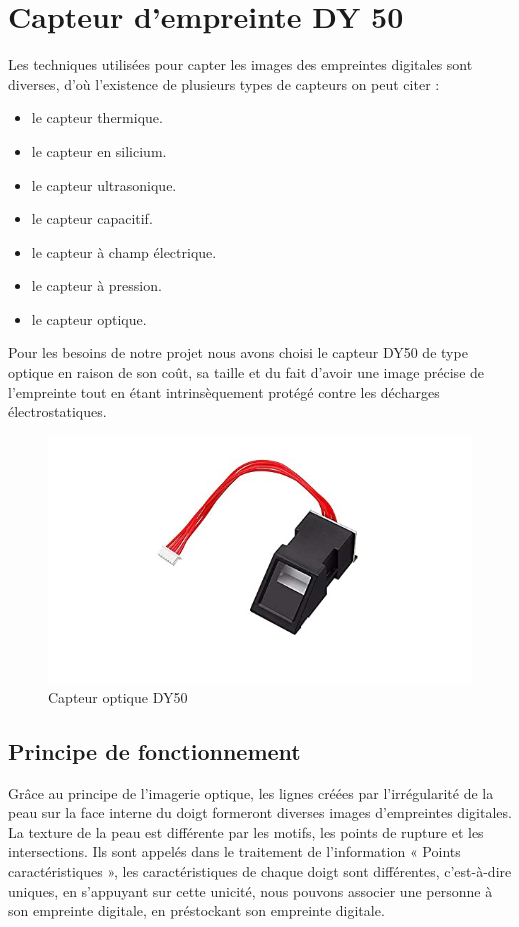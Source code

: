         
\section{Capteur d'empreinte DY 50}
Les techniques utilisées pour capter les images des empreintes digitales sont 
diverses, d’où l’existence de plusieurs types de capteurs on peut citer :

\begin{itemize}
    \item le capteur thermique.
    \item le capteur en silicium.
    \item le capteur ultrasonique.
    \item le capteur capacitif.
    \item le capteur à champ électrique.
    \item le capteur à pression.
    \item le capteur optique.
\end{itemize}

Pour les besoins de notre projet nous avons choisi le capteur DY50 de type 
optique en raison de son coût, sa taille et du fait d’avoir une image précise 
de l’empreinte tout en étant intrinsèquement protégé contre les décharges 
électrostatiques.

\begin{figure}[h!]
    \centering
    \includegraphics[scale=0.8]{images/dy50.jpg}
    \caption{Capteur optique DY50}
    \label{fig51}
\end{figure}

\subsection{Principe de fonctionnement}
Grâce au principe de l’imagerie optique, les lignes créées par l’irrégularité de 
la peau sur la face interne du doigt formeront diverses images d’empreintes 
digitales. La texture de la peau est différente par les motifs, les points de 
rupture et les intersections. Ils sont appelés dans le traitement de 
l’information « Points caractéristiques », les caractéristiques de chaque 
doigt sont différentes, c’est-à-dire uniques, en s’appuyant sur cette unicité, 
nous pouvons associer une personne à son empreinte digitale, en préstockant son 
empreinte digitale.
    
